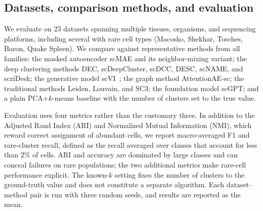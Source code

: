 \subsection{Datasets, comparison methods, and evaluation}

We evaluate on 23 datasets spanning multiple tissues, organisms, and sequencing platforms,
including several with rare cell types (Macosko, Shekhar, Tosches, Baron, Quake Spleen).
We compare against representative methods from all families: the masked autoencoder scMAE
and its neighbor-mixing variant; the deep clustering methods DEC, scDeepCluster, scDCC,
DESC, scNAME, and scziDesk; the generative model scVI~\citep{scvi2018}; the graph method
AttentionAE-sc; the traditional methods Leiden, Louvain, and SC3; the foundation model
scGPT; and a plain PCA+$k$-means baseline with the number of clusters set to the true
value.

Evaluation uses four metrics rather than the customary three. In addition to the Adjusted
Rand Index (ARI) and Normalized Mutual Information (NMI), which reward correct assignment
of abundant cells, we report macro-averaged F1 and rare-cluster recall, defined as the
recall averaged over classes that account for less than $2\%$ of cells. ARI and accuracy
are dominated by large classes and can conceal failures on rare populations; the two
additional metrics make rare-cell performance explicit. The known-$k$ setting fixes the
number of clusters to the ground-truth value and does not constitute a separate algorithm.
Each dataset--method pair is run with three random seeds, and results are reported as the
mean.
